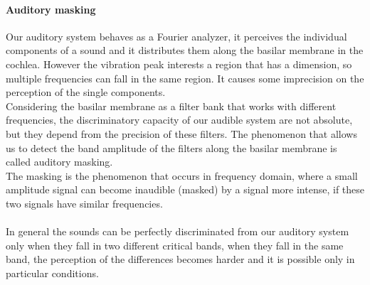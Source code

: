 \paragraph{Auditory masking}
Our auditory system behaves as a Fourier analyzer, it perceives the individual components of a sound and it distributes them along the basilar membrane in the cochlea. However the vibration peak interests a region that has a dimension, so multiple frequencies can fall in the same region. It causes some imprecision on the perception of the single components.\\
Considering the basilar membrane as a filter bank that works with different frequencies, the discriminatory capacity of our audible system are not absolute, but they depend from the precision of these filters. The phenomenon that allows us to detect the band amplitude of the filters along the basilar membrane is called auditory masking.\\
The masking is the phenomenon that occurs in frequency domain, where a small amplitude signal can become inaudible (masked) by a signal more intense, if these two signals have similar frequencies.\\\\
In general the sounds can be perfectly discriminated from our auditory system only when they fall in two different critical bands, when they fall in the same band, the perception of the differences becomes harder and it is possible only in particular conditions. \cite{soundanalysis}

